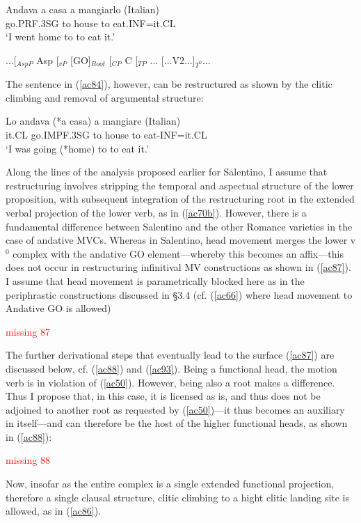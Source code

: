 \documentclass[output=paper]{langscibook}
\begin{document}
\ea \label{ac84}\gll Andava   a casa   a    mangiarlo       \hfill (Italian)\\
    go.PRF.3SG to house  to   eat.INF=it.CL\\
    \glt ‘I went home to to eat it.’
\z

\ea \label{ac85}...[$_{AspP}$ Asp [$_{vP}$ [GO]$_{Root}$ [$_{CP}$ C [$_{TP}$ ... [...V2...]$_{T^0}$...
\z

The sentence in (\ref{ac84}), however, can be restructured as shown by the clitic climbing and removal of argumental structure:

\ea \label{ac86}\gll Lo   andava    (*a casa) a mangiare  \hfill    (Italian)\\
    it.CL go.IMPF.3SG  to house to  eat-INF=it.CL\\
    \glt ‘I was going  (*home) to to eat it.’
\z

Along the lines of the analysis proposed earlier for Salentino, I assume that restructuring involves stripping the temporal and aspectual structure of the lower proposition, with subsequent integration of the restructuring root in the extended verbal projection of the lower verb, as in (\ref{ac70b}).  However, there is a fundamental difference between Salentino and the other Romance varieties in the case of andative MVCs. Whereas in Salentino, head movement merges the lower v$^0$ complex with the andative GO element—whereby this becomes an affix—this does not occur in restructuring infinitival MV constructions as shown in (\ref{ac87}).  I assume that head movement is parametrically blocked here as in the periphrastic constructions discussed in §3.4 (cf. (\ref{ac66}) where head movement to Andative GO is allowed)

\ea \label{ac87}
\textcolor{red}{missing 87}
\z

The further derivational steps that eventually lead to the surface (\ref{ac87}) are discussed below, cf. (\ref{ac88}) and (\ref{ac93}).  Being a functional head, the motion verb is in violation of (\ref{ac50}).  However, being also a root makes a difference.  Thus I propose that, in this case, it is licensed as is, and thus does not be adjoined to another root as requested by (\ref{ac50})—it thus becomes an auxiliary in itself—and can therefore be the host of the higher functional heads, as shown in (\ref{ac88}):  

\ea \label{ac88}
\textcolor{red}{missing 88}
\z

Now, insofar as the entire complex is a single extended functional projection, therefore a single clausal structure, clitic climbing to a hight clitic landing site is allowed, as in (\ref{ac86}). 
\end{document}
